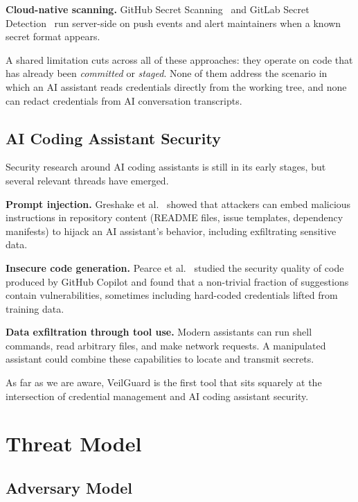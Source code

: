 \documentclass[conference]{IEEEtran}
\begin{document}
\textbf{Cloud-native scanning.}
GitHub Secret Scanning~\cite{github_secret_scanning} and GitLab Secret
Detection~\cite{gitlab_secret_detection} run server-side on push events and
alert maintainers when a known secret format appears.

A shared limitation cuts across all of these approaches: they operate on code
that has already been \emph{committed} or \emph{staged}. None of them address
the scenario in which an AI assistant reads credentials directly from the
working tree, and none can redact credentials from AI conversation transcripts.

\subsection{AI Coding Assistant Security}

Security research around AI coding assistants is still in its early stages, but
several relevant threads have emerged.

\textbf{Prompt injection.}
Greshake et al.~\cite{greshake2023inject} showed that attackers can embed
malicious instructions in repository content (README files, issue templates,
dependency manifests) to hijack an AI assistant's behavior, including
exfiltrating sensitive data.

\textbf{Insecure code generation.}
Pearce et al.~\cite{pearce2022asleep} studied the security quality of code
produced by GitHub Copilot and found that a non-trivial fraction of suggestions
contain vulnerabilities, sometimes including hard-coded credentials lifted from
training data.

\textbf{Data exfiltration through tool use.}
Modern assistants can run shell commands, read arbitrary files, and make network
requests. A manipulated assistant could combine these capabilities to locate and
transmit secrets.

As far as we are aware, VeilGuard is the first tool that sits squarely at the
intersection of credential management and AI coding assistant security.


\section{Threat Model}
\label{sec:threat}

\subsection{Adversary Model}
\end{document}
